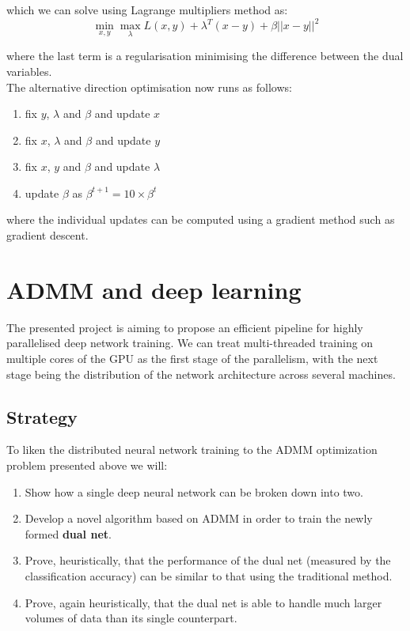 \documentclass[a4paper, 11pt]{article}
\numberwithin{equation}{section}
\begin{document}
	which we can solve using Lagrange multipliers method as:
	\begin{equation}
	\label{ADMM_equation}
	\min_{x,y} \max_{\lambda} L(x,y) + \lambda^T (x-y) + \beta ||x-y||^2
	\end{equation}
	
	where the last term is a regularisation minimising the difference between the dual variables. \\
	
	The alternative direction optimisation now runs as follows:
	\begin{enumerate}
		\item fix $y$, $\lambda$ and $\beta$ and update $x$
		\item fix $x$, $\lambda$ and $\beta$ and update $y$
		\item fix $x$, $y$ and $\beta$ and update $\lambda$
		\item update $\beta$ as $\beta^{t+1}=10 \times \beta^{t}$
	\end{enumerate} 
	
	where the individual updates can be computed using a gradient method such as gradient descent.
	
	\section{ADMM and deep learning}
	
	The presented project is aiming to propose an efficient pipeline for highly parallelised deep network training. We can treat multi-threaded training on multiple cores of the GPU as the first stage of the parallelism, with the next stage being the distribution of the network architecture across several machines.
	
	\subsection{Strategy}
	
	To liken the distributed neural network training to the ADMM optimization problem presented above we will:
	\begin{enumerate}
		\item Show how a single deep neural network can be broken down into two.
		\item Develop a novel algorithm based on ADMM in order to train the newly formed \textbf{dual net}.
		\item Prove, heuristically, that the performance of the dual net (measured by the classification accuracy) can be similar to that using the traditional method.
		\item Prove, again heuristically, that the dual net is able to handle much larger volumes of data than its single counterpart.
	\end{enumerate}
	
\end{document}
